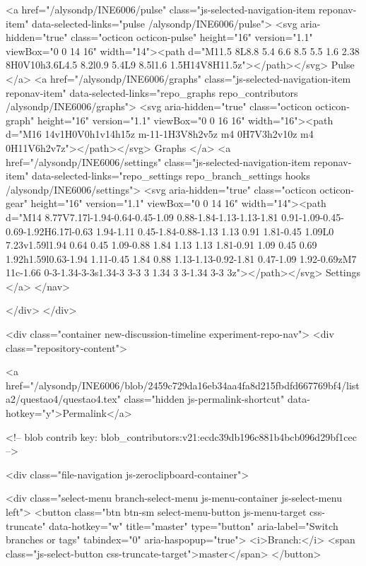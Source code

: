   <a href="/alysondp/INE6006/pulse" class="js-selected-navigation-item reponav-item" data-selected-links="pulse /alysondp/INE6006/pulse">
    <svg aria-hidden="true" class="octicon octicon-pulse" height="16" version="1.1" viewBox="0 0 14 16" width="14"><path d="M11.5 8L8.8 5.4 6.6 8.5 5.5 1.6 2.38 8H0V10h3.6L4.5 8.2l0.9 5.4L9 8.5l1.6 1.5H14V8H11.5z"></path></svg>
    Pulse
</a>
  <a href="/alysondp/INE6006/graphs" class="js-selected-navigation-item reponav-item" data-selected-links="repo_graphs repo_contributors /alysondp/INE6006/graphs">
    <svg aria-hidden="true" class="octicon octicon-graph" height="16" version="1.1" viewBox="0 0 16 16" width="16"><path d="M16 14v1H0V0h1v14h15z m-11-1H3V8h2v5z m4 0H7V3h2v10z m4 0H11V6h2v7z"></path></svg>
    Graphs
</a>
    <a href="/alysondp/INE6006/settings" class="js-selected-navigation-item reponav-item" data-selected-links="repo_settings repo_branch_settings hooks /alysondp/INE6006/settings">
      <svg aria-hidden="true" class="octicon octicon-gear" height="16" version="1.1" viewBox="0 0 14 16" width="14"><path d="M14 8.77V7.17l-1.94-0.64-0.45-1.09 0.88-1.84-1.13-1.13-1.81 0.91-1.09-0.45-0.69-1.92H6.17l-0.63 1.94-1.11 0.45-1.84-0.88-1.13 1.13 0.91 1.81-0.45 1.09L0 7.23v1.59l1.94 0.64 0.45 1.09-0.88 1.84 1.13 1.13 1.81-0.91 1.09 0.45 0.69 1.92h1.59l0.63-1.94 1.11-0.45 1.84 0.88 1.13-1.13-0.92-1.81 0.47-1.09 1.92-0.69zM7 11c-1.66 0-3-1.34-3-3s1.34-3 3-3 3 1.34 3 3-1.34 3-3 3z"></path></svg>
      Settings
</a>
</nav>

  </div>
</div>

<div class="container new-discussion-timeline experiment-repo-nav">
  <div class="repository-content">

    

<a href="/alysondp/INE6006/blob/2459c729da16eb34aa4fa8d215fbdfd667769bf4/lista2/questao4/questao4.tex" class="hidden js-permalink-shortcut" data-hotkey="y">Permalink</a>

<!-- blob contrib key: blob_contributors:v21:ecdc39db196c881b4bcb096d29bf1cec -->

<div class="file-navigation js-zeroclipboard-container">
  
<div class="select-menu branch-select-menu js-menu-container js-select-menu left">
  <button class="btn btn-sm select-menu-button js-menu-target css-truncate" data-hotkey="w"
    title="master"
    type="button" aria-label="Switch branches or tags" tabindex="0" aria-haspopup="true">
    <i>Branch:</i>
    <span class="js-select-button css-truncate-target">master</span>
  </button>

